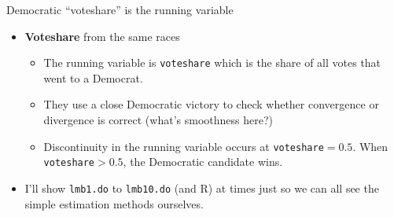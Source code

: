 \documentclass{beamer}
\begin{document}
\begin{frame}{Democratic ``voteshare'' is the running variable}

\begin{itemize}
	\item \textbf{Voteshare} from the same races
		\begin{itemize}
		\item The running variable is \texttt{voteshare} which is the share of all votes that went to a Democrat. 
		\item They use a close Democratic victory to check whether convergence or divergence is correct (what's smoothness here?)
		\item  Discontinuity in the running variable occurs at \texttt{voteshare}$=0.5$. When \texttt{voteshare}$>0.5$, the Democratic candidate wins.  
		\end{itemize}
	\item I'll show \texttt{lmb1.do} to \texttt{lmb10.do} (and R) at times just so we can all see the simple estimation methods ourselves. 
\end{itemize}

\end{frame}
\end{document}
